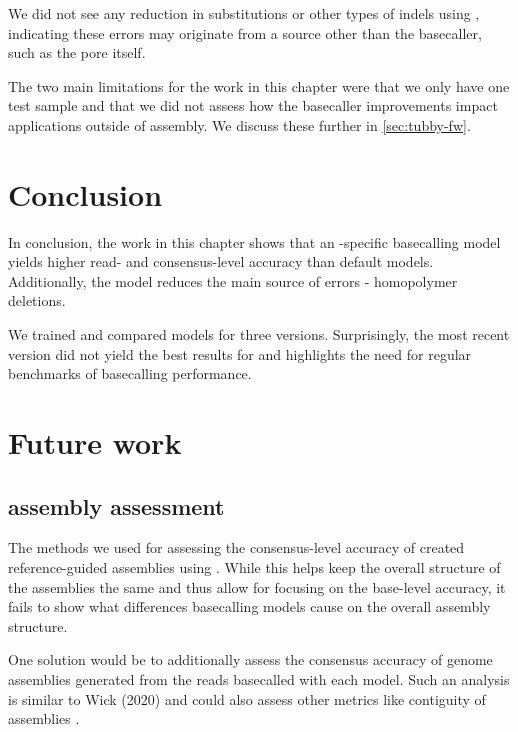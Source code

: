 We did not see any reduction in substitutions or other types of indels using \tubby{}, indicating these errors may originate from a source other than the basecaller, such as the pore itself.

\noindent
The two main limitations for the work in this chapter were that we only have one test sample and that we did not assess how the basecaller improvements impact applications outside of assembly. We discuss these further in \autoref{sec:tubby-fw}.


\section{Conclusion}
In conclusion, the work in this chapter shows that an \mtb{}-specific \ont{} basecalling model yields higher read- and consensus-level accuracy than default models. Additionally, the \mtb{} model reduces the main source of \ont{} errors - homopolymer deletions.

We trained and compared models for three \guppy{} versions. Surprisingly, the most recent version did not yield the best results for \mtb{} and highlights the need for regular benchmarks of \ont{} basecalling performance.

\section{Future work}
\label{sec:tubby-fw}

\subsection{\denovo{} assembly assessment}
The methods we used for assessing the consensus-level accuracy of \tubby{} created reference-guided assemblies using . While this helps keep the overall structure of the assemblies the same and thus allow for focusing on the base-level accuracy, it fails to show what differences basecalling models cause on the overall assembly structure.

One solution would be to additionally assess the consensus accuracy of \denovo{} genome assemblies generated from the \ont{} reads basecalled with each model. Such an analysis is similar to Wick \etal{} (2020) and could also assess other metrics like contiguity of assemblies \cite{wick2020}.

